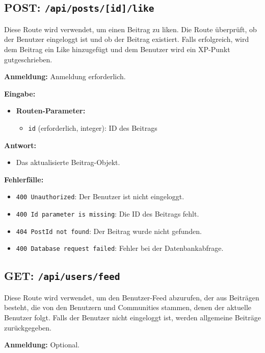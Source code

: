 \documentclass[a4paper,12pt]{article}
\begin{document}
\newpage
\subsection{POST: \texttt{/api/posts/[id]/like}}

Diese Route wird verwendet, um einen Beitrag zu liken. Die Route überprüft, ob
der Benutzer eingeloggt ist und ob der Beitrag existiert. Falls erfolgreich,
wird dem Beitrag ein Like hinzugefügt und dem Benutzer wird ein XP-Punkt
gutgeschrieben.

\textbf{Anmeldung:} Anmeldung erforderlich.

\textbf{Eingabe:}
\begin{itemize}
    \item \textbf{Routen-Parameter:}
    \begin{itemize}
        \item \texttt{id} (erforderlich, integer):
            ID des Beitrags
    \end{itemize}
\end{itemize}

\textbf{Antwort:}
\begin{itemize}
    \item Das aktualisierte Beitrag-Objekt.
\end{itemize}

\textbf{Fehlerfälle:}
\begin{itemize}
    \item \texttt{400 Unauthorized}:
        Der Benutzer ist nicht eingeloggt.
    \item \texttt{400 Id parameter is missing}:
        Die ID des Beitrags fehlt.
    \item \texttt{404 PostId not found}:
        Der Beitrag wurde nicht gefunden.
    \item \texttt{400 Database request failed}:
        Fehler bei der Datenbankabfrage.
\end{itemize}

\newpage
\subsection{GET: \texttt{/api/users/feed}}

Diese Route wird verwendet, um den Benutzer-Feed abzurufen, der aus Beiträgen
besteht, die von den Benutzern und Communities stammen, denen der aktuelle
Benutzer folgt. Falls der Benutzer nicht eingeloggt ist, werden allgemeine
Beiträge zurückgegeben.

\textbf{Anmeldung:} Optional.
\end{document}
